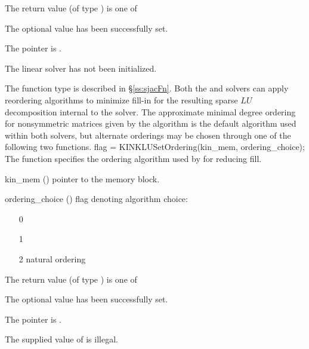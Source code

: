 {
  The return value  (of type ) is one of
  \begin{args}
  \item[\Id{KINSLS\_SUCCESS}] 
    The optional value has been successfully set.
  \item[\Id{KINSLS\_MEM\_NULL}]
    The  pointer is .
  \item[\Id{KINSLS\_LMEM\_NULL}]
    The {\kinsls} linear solver has not been initialized.
  \end{args}
}
{
  The function type  is described in \S\ref{ss:sjacFn}.
}
Both the {\kinklu} and {\kinsuperlumt} solvers can apply reordering
algorithms to minimize fill-in for the resulting sparse $LU$
decomposition internal to the solver.  The approximate minimal degree
ordering for nonsymmetric matrices given by the  algorithm
is the default algorithm used within both solvers, but alternate
orderings may be chosen through one of the following two functions.
{
  flag = KINKLUSetOrdering(kin\_mem, ordering\_choice);
}
{
  The function  specifies the ordering algorithm
  used by {\kinklu} for reducing fill.
}
{
  \begin{args}
  \item[kin\_mem] ()
    pointer to the {\kinsol} memory block.
  \item[ordering\_choice] ()
    flag denoting algorithm choice:
    \begin{itemize}
    \item[0] 
    \item[1] 
    \item[2] natural ordering
    \end{itemize}
  \end{args}
}
{
  The return value  (of type ) is one of
  \begin{args}
  \item[\Id{KINSLS\_SUCCESS}] 
    The optional value has been successfully set.
  \item[\Id{KINSLS\_MEM\_NULL}]
    The  pointer is .
  \item[\Id{KINSLS\_ILL\_INPUT}]
    The supplied value of  is illegal.
  \end{args}
}

